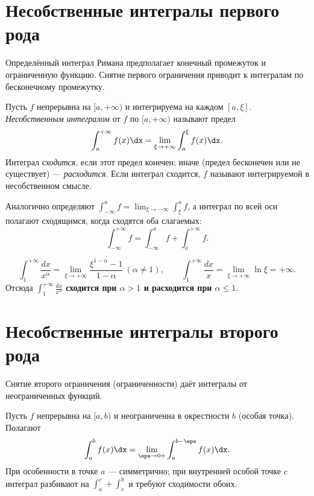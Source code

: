\section{Несобственные интегралы первого рода}

Определённый интеграл Римана предполагает конечный промежуток и ограниченную функцию. Снятие
первого ограничения приводит к интегралам по бесконечному промежутку.

\begin{definition}
Пусть $f$ непрерывна на $[a,+\infty)$ и интегрируема на каждом $[a,\xi]$. \emph{Несобственным
интегралом} от $f$ по $[a,+\infty)$ называют предел
\[
  \int_a^{+\infty}f(x)\dx=\lim_{\xi\to+\infty}\int_a^{\xi}f(x)\dx .
\]
Интеграл \emph{сходится}, если этот предел конечен; иначе (предел бесконечен или не существует) —
\emph{расходится}. Если интеграл сходится, $f$ называют интегрируемой в несобственном смысле.
\end{definition}

Аналогично определяют $\displaystyle\int_{-\infty}^{a}f=\lim_{\xi\to-\infty}\int_\xi^a f$, а
интеграл по всей оси полагают сходящимся, когда сходятся оба слагаемых:
\[
  \int_{-\infty}^{+\infty}f=\int_{-\infty}^{a}f+\int_a^{+\infty}f .
\]

\begin{example}
\[
  \int_1^{+\infty}\frac{dx}{x^\alpha}=\lim_{\xi\to+\infty}\frac{\xi^{1-\alpha}-1}{1-\alpha}
   \ (\alpha\ne1),\qquad
  \int_1^{+\infty}\frac{dx}{x}=\lim_{\xi\to+\infty}\ln\xi=+\infty .
\]
Отсюда $\displaystyle\int_1^{+\infty}\frac{dx}{x^\alpha}$ \textbf{сходится при $\alpha>1$ и
расходится при $\alpha\le1$}.
\end{example}

\section{Несобственные интегралы второго рода}

Снятие второго ограничения (ограниченности) даёт интегралы от неограниченных функций.

\begin{definition}
Пусть $f$ непрерывна на $[a,b)$ и неограниченна в окрестности $b$ (особая точка). Полагают
\[
  \int_a^{b}f(x)\dx=\lim_{\eps\to0+}\int_a^{b-\eps}f(x)\dx .
\]
При особенности в точке $a$ — симметрично; при внутренней особой точке $c$ интеграл разбивают на
$\int_a^c+\int_c^b$ и требуют сходимости обоих.
\end{definition}

